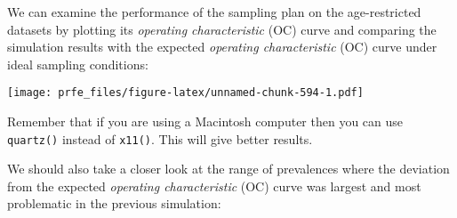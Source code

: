 \documentclass[
  12pt,
  a4paper]{book}
\newenvironment{Shaded}{\begin{snugshade}}{\end{snugshade}}
\newcommand{\AttributeTok}[1]{\textcolor[rgb]{0.77,0.63,0.00}{#1}}
\newcommand{\ConstantTok}[1]{\textcolor[rgb]{0.00,0.00,0.00}{#1}}
\newcommand{\DecValTok}[1]{\textcolor[rgb]{0.00,0.00,0.81}{#1}}
\newcommand{\FloatTok}[1]{\textcolor[rgb]{0.00,0.00,0.81}{#1}}
\newcommand{\FunctionTok}[1]{\textcolor[rgb]{0.00,0.00,0.00}{#1}}
\newcommand{\NormalTok}[1]{#1}
\newcommand{\SpecialCharTok}[1]{\textcolor[rgb]{0.00,0.00,0.00}{#1}}
\newcommand{\StringTok}[1]{\textcolor[rgb]{0.31,0.60,0.02}{#1}}
\begin{document}
We can examine the performance of the sampling plan on the age-restricted datasets by plotting its \emph{operating characteristic} (OC) curve and comparing the simulation results with the expected \emph{operating characteristic} (OC) curve under ideal sampling conditions:

\begin{Shaded}
\end{Shaded}

\texttt{[image: prfe\_files/figure-latex/unnamed-chunk-594-1.pdf]}

Remember that if you are using a Macintosh computer then you can use \texttt{quartz()} instead of \texttt{x11()}. This will give better results.

We should also take a closer look at the range of prevalences where the deviation from the expected \emph{operating characteristic} (OC) curve was largest and most problematic in the previous simulation:

\begin{Shaded}
\end{Shaded}
\end{document}
